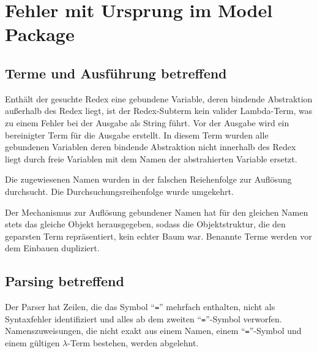 \documentclass[parskip=full,11pt,openany]{scrreprt}
\begin{document}
\section{Fehler mit Ursprung im Model Package}

\subsection{Terme und Ausführung betreffend}
\begin{itemize}[itemsep=3ex]
	{Enthält der gesuchte Redex eine gebundene Variable, deren bindende Abstraktion außerhalb des Redex liegt, ist der Redex-Subterm kein valider Lambda-Term, was zu einem Fehler bei der Ausgabe als String führt.}
	{Vor der Ausgabe wird ein bereinigter Term für die Ausgabe erstellt. In diesem Term wurden alle gebundenen Variablen deren bindende Abstraktion nicht innerhalb des Redex liegt durch freie Variablen mit dem Namen der abstrahierten Variable ersetzt.}
	
	{Die zugewiesenen Namen wurden in der falschen Reiehenfolge zur Auflösung durchsucht.}
	{Die Durchsuchungsreihenfolge wurde umgekehrt.}
	
	{Der Mechanismus zur Auflösung gebundener Namen hat für den gleichen Namen stets das gleiche Objekt
		herausgegeben, sodass die Objektstruktur, die den geparsten Term repräsentiert, kein echter Baum war.}
	{Benannte Terme werden vor dem Einbauen dupliziert.}
\end{itemize}

\subsection{Parsing betreffend}
\begin{itemize}[itemsep=3ex]
	{Der Parser hat Zeilen, die das Symbol \enquote{\texttt{=}} mehrfach enthalten, nicht als Syntaxfehler identifiziert und
		alles ab dem zweiten \enquote{\texttt{=}}-Symbol verworfen.}
	{Namenszuweisungen, die nicht exakt aus einem Namen, einem \enquote{\texttt{=}}-Symbol und einem gültigen
		$\lambda$-Term bestehen, werden abgelehnt.}
\end{itemize}
\end{document}
